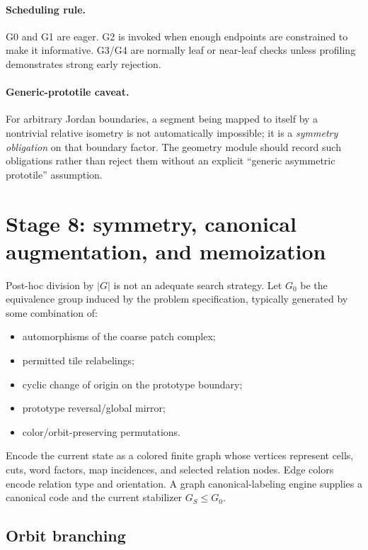 \documentclass[11pt]{article}
\begin{document}
\paragraph{Scheduling rule.}
G0 and G1 are eager.  G2 is invoked when enough endpoints are constrained to make it informative.  G3/G4 are normally leaf or near-leaf checks unless profiling demonstrates strong early rejection.

\paragraph{Generic-prototile caveat.}
For arbitrary Jordan boundaries, a segment being mapped to itself by a nontrivial relative isometry is not automatically impossible; it is a \emph{symmetry obligation} on that boundary factor.  The geometry module should record such obligations rather than reject them without an explicit ``generic asymmetric prototile'' assumption.

\section{Stage 8: symmetry, canonical augmentation, and memoization}
\label{sec:symmetry}

Post-hoc division by $|G|$ is not an adequate search strategy.  Let $G_0$ be the equivalence group induced by the problem specification, typically generated by some combination of:
\begin{itemize}
  \item automorphisms of the coarse patch complex;
  \item permitted tile relabelings;
  \item cyclic change of origin on the prototype boundary;
  \item prototype reversal/global mirror;
  \item color/orbit-preserving permutations.
\end{itemize}

Encode the current state as a colored finite graph whose vertices represent cells, cuts, word factors, map incidences, and selected relation nodes.  Edge colors encode relation type and orientation.  A graph canonical-labeling engine supplies a canonical code and the current stabilizer $G_S\leq G_0$.

\subsection{Orbit branching}
\end{document}
